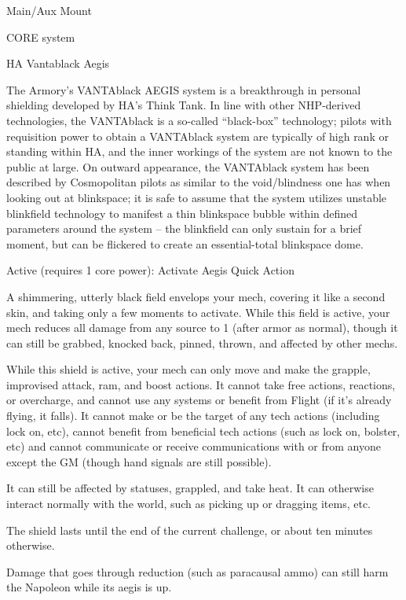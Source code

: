  Main/Aux Mount

                                               CORE system




                                                HA Vantablack Aegis

 The Armory’s VANTAblack AEGIS system is a breakthrough in personal shielding developed by HA’s
 Think Tank. In line with other NHP-derived technologies, the VANTAblack is a so-called “black-box”
 technology; pilots with requisition power to obtain a VANTAblack system are typically of high rank or
 standing within HA, and the inner workings of the system are not known to the public at large. On
 outward appearance, the VANTAblack system has been described by Cosmopolitan pilots as similar to
 the void/blindness one has when looking out at blinkspace; it is safe to assume that the system utilizes
 unstable blinkfield technology to manifest a thin blinkspace bubble within defined parameters around
 the system -- the blinkfield can only sustain for a brief moment, but can be flickered to create an
 essential-total blinkspace dome.

 Active (requires 1 core power): Activate Aegis
 Quick Action

 A shimmering, utterly black field envelops your mech, covering it like a second skin, and taking only a
 few moments to activate. While this field is active, your mech reduces all damage from any source to 1
 (after armor as normal), though it can still be grabbed, knocked back, pinned, thrown, and affected by
 other mechs.


 While this shield is active, your mech can only move and make the grapple, improvised attack, ram,
 and boost actions. It cannot take free actions, reactions, or overcharge, and cannot use any systems or
 benefit from Flight (if it’s already flying, it falls). It cannot make or be the target of any tech actions
 (including lock on, etc), cannot benefit from beneficial tech actions (such as lock on, bolster, etc) and
 cannot communicate or receive communications with or from anyone except the GM (though hand
 signals are still possible).


  It can still be affected by statuses, grappled, and take heat. It can otherwise interact normally with the
 world, such as picking up or dragging items, etc.


 The shield lasts until the end of the current challenge, or about ten minutes otherwise.

 Damage that goes through reduction (such as paracausal ammo) can still harm the Napoleon while its
 aegis is up.

